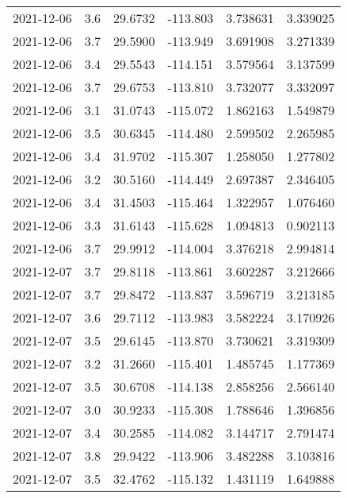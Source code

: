 \begin{tabular}{lrrrrr}
2021-12-06 &       3.6 &  29.6732 &  -113.803 &         3.738631 &         3.339025 \\
2021-12-06 &       3.7 &  29.5900 &  -113.949 &         3.691908 &         3.271339 \\
2021-12-06 &       3.4 &  29.5543 &  -114.151 &         3.579564 &         3.137599 \\
2021-12-06 &       3.7 &  29.6753 &  -113.810 &         3.732077 &         3.332097 \\
2021-12-06 &       3.1 &  31.0743 &  -115.072 &         1.862163 &         1.549879 \\
2021-12-06 &       3.5 &  30.6345 &  -114.480 &         2.599502 &         2.265985 \\
2021-12-06 &       3.4 &  31.9702 &  -115.307 &         1.258050 &         1.277802 \\
2021-12-06 &       3.2 &  30.5160 &  -114.449 &         2.697387 &         2.346405 \\
2021-12-06 &       3.4 &  31.4503 &  -115.464 &         1.322957 &         1.076460 \\
2021-12-06 &       3.3 &  31.6143 &  -115.628 &         1.094813 &         0.902113 \\
2021-12-06 &       3.7 &  29.9912 &  -114.004 &         3.376218 &         2.994814 \\
2021-12-07 &       3.7 &  29.8118 &  -113.861 &         3.602287 &         3.212666 \\
2021-12-07 &       3.7 &  29.8472 &  -113.837 &         3.596719 &         3.213185 \\
2021-12-07 &       3.6 &  29.7112 &  -113.983 &         3.582224 &         3.170926 \\
2021-12-07 &       3.5 &  29.6145 &  -113.870 &         3.730621 &         3.319309 \\
2021-12-07 &       3.2 &  31.2660 &  -115.401 &         1.485745 &         1.177369 \\
2021-12-07 &       3.5 &  30.6708 &  -114.138 &         2.858256 &         2.566140 \\
2021-12-07 &       3.0 &  30.9233 &  -115.308 &         1.788646 &         1.396856 \\
2021-12-07 &       3.4 &  30.2585 &  -114.082 &         3.144717 &         2.791474 \\
2021-12-07 &       3.8 &  29.9422 &  -113.906 &         3.482288 &         3.103816 \\
2021-12-07 &       3.5 &  32.4762 &  -115.132 &         1.431119 &         1.649888 \\

\end{tabular}

